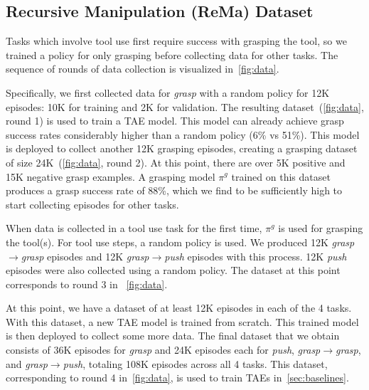 \documentclass[10pt,twocolumn,letterpaper]{article}
\begin{document}





\subsection{Recursive Manipulation (ReMa) Dataset}
\label{exp:data}

Tasks which involve tool use first require success with grasping the tool, so we trained a policy for only grasping before collecting data for other tasks. The sequence of rounds of data collection is visualized in~\cref{fig:data}.

Specifically, we first collected data for \emph{grasp} with a random policy for 12K episodes: 10K for training and 2K for validation. The resulting dataset~(\cref{fig:data}, round 1) is used to train a TAE model. This model can already achieve grasp success rates considerably higher than a random policy (6\% vs 51\%). This model is deployed to collect another 12K grasping episodes, creating a grasping dataset of size 24K~(\cref{fig:data}, round 2). At this point, there are over 5K positive and 15K negative grasp examples. A grasping model $\pi^g$ trained on this dataset produces a grasp success rate of 88\%, which we find to be sufficiently high to start collecting episodes for other tasks.

When data is collected in a tool use task for the first time, $\pi^g$ is used for grasping the tool(s). For tool use steps, a random policy is used. We produced 12K \emph{grasp$\rightarrow$grasp} episodes and 12K \emph{grasp$\rightarrow$push} episodes with this process. 12K \emph{push} episodes were also collected using a random policy. The dataset at this point corresponds to round 3 in ~\cref{fig:data}.

At this point, we have a dataset of at least 12K episodes in each of the 4 tasks. With this dataset, a new TAE model is trained from scratch. This trained model is then deployed to collect some more data. The final dataset that we obtain consists of 36K episodes for \emph{grasp} and 24K episodes each for \emph{push}, \emph{grasp$\rightarrow$grasp}, and \emph{grasp$\rightarrow$push}, totaling 108K episodes across all 4 tasks. This dataset, corresponding to round 4 in~\cref{fig:data}, is used to train TAEs in~\cref{sec:baselines}.
\end{document}
